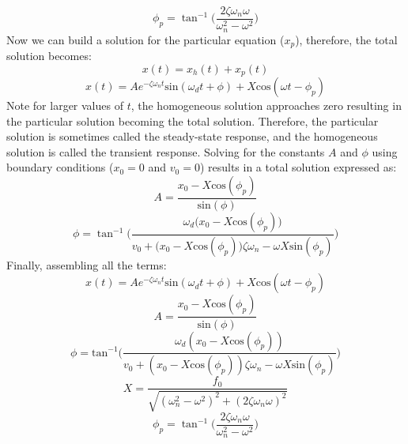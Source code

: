 \documentclass[12pt,letter]{article}
\begin{document}
	\begin{equation}
		\phi_p = \tan^{-1} \bigg(\frac{2\zeta \omega_n \omega}{\omega_n^2 - \omega^2}\bigg)
	\end{equation}				
	Now we can build a solution for the particular equation ($x_p$), therefore, the total solution becomes:
	\begin{equation}
		x(t) = x_h(t) + x_p(t)
	\end{equation}
	\begin{equation}
		x(t) = Ae^{-\zeta \omega_n t}\text{sin}(\omega_d t + \phi) +  X \text{cos}(\omega t - \phi_p)
	\end{equation}				
	Note for larger values of $t$, the homogeneous solution approaches zero resulting in the particular solution becoming the total solution. Therefore, the particular solution is sometimes called the steady-state response, and the homogeneous solution is called the transient response. Solving for the constants $A$ and $\phi$ using boundary conditions ($x_0=0$ and $v_0=0$) results in a total solution expressed as:
	\begin{equation}
		A = \frac{x_0 -X \text{cos}(\phi_p)}{\text{sin}(\phi)}
	\end{equation}			 
	\begin{equation}
		\phi =  \tan^{-1} \bigg(\frac{\omega_d \big( x_0 -X \text{cos}(\phi_p)\big)}{v_0 + \big(x_0 - X \text{cos}(\phi_p)\big) \zeta \omega_n - \omega X \text{sin}(\phi_p) }\bigg)
	\end{equation}			
	Finally, assembling all the terms:
	\begin{equation}
		x(t) = Ae^{-\zeta \omega_n t}\text{sin}(\omega_d t + \phi) +  X \text{cos}(\omega t - \phi_p)
		\label{eq:damped_forced_x}
	\end{equation}
	\begin{equation}
		A = \frac{x_0 -X \text{cos}(\phi_p)}{\text{sin}(\phi)}
	\end{equation}			 
	\begin{equation}
		\phi =  \text{tan}^{-1}\bigg(\frac{\omega_d ( x_0 -X \text{cos}(\phi_p))}{v_0 + (x_0 - X \text{cos}(\phi_p)) \zeta \omega_n - \omega X \text{sin}(\phi_p) }\bigg)
	\end{equation}	
	\begin{equation}
		X = \frac{f_0}{\sqrt{(\omega_n^2 - \omega^2)^2 +  (2\zeta \omega_n \omega)^2}} 
	\end{equation}	
	\begin{equation}
		\phi_p = \tan^{-1} \bigg(\frac{2\zeta \omega_n \omega}{\omega_n^2 - \omega^2}\bigg)
		\label{eq:damped_forced_theta_p}
	\end{equation}		
\end{document}
